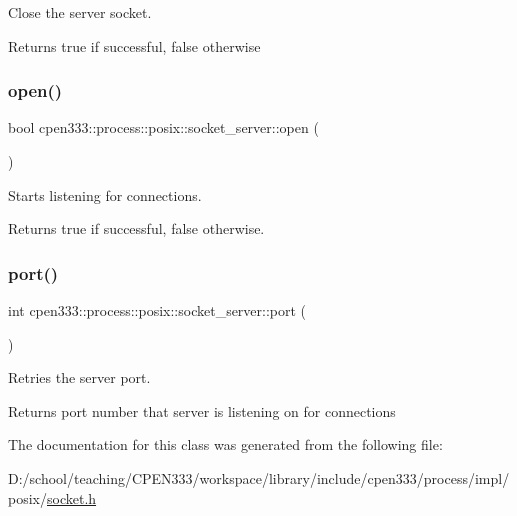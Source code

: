 Close the server socket. 

\begin{DoxyReturn}{Returns}
true if successful, false otherwise 
\end{DoxyReturn}
\mbox{\label{classcpen333_1_1process_1_1posix_1_1socket__server_a3da498856b5fb812e2e983561cf88944}} 
\subsubsection{\texorpdfstring{open()}{open()}}
{\footnotesize\ttfamily bool cpen333\+::process\+::posix\+::socket\+\_\+server\+::open (\begin{DoxyParamCaption}{ }\end{DoxyParamCaption})\hspace{0.3cm}{\ttfamily [inline]}}



Starts listening for connections. 

\begin{DoxyReturn}{Returns}
true if successful, false otherwise. 
\end{DoxyReturn}
\mbox{\label{classcpen333_1_1process_1_1posix_1_1socket__server_a5962af3110c19660b29f154f867e87e2}} 
\subsubsection{\texorpdfstring{port()}{port()}}
{\footnotesize\ttfamily int cpen333\+::process\+::posix\+::socket\+\_\+server\+::port (\begin{DoxyParamCaption}{ }\end{DoxyParamCaption})\hspace{0.3cm}{\ttfamily [inline]}}



Retries the server port. 

\begin{DoxyReturn}{Returns}
port number that server is listening on for connections 
\end{DoxyReturn}


The documentation for this class was generated from the following file\+:\begin{DoxyCompactItemize}
\item 
D\+:/school/teaching/\+C\+P\+E\+N333/workspace/library/include/cpen333/process/impl/posix/\hyperlink{impl_2posix_2socket_8h}{socket.\+h}\end{DoxyCompactItemize}
